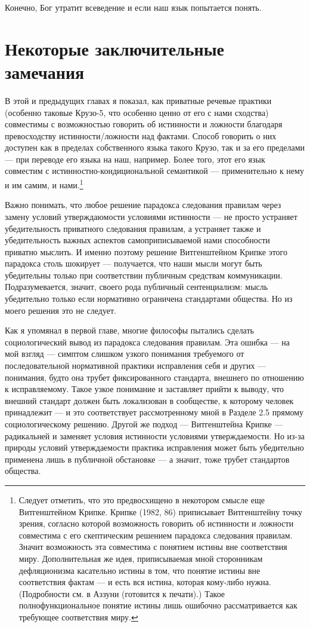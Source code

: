 \documentclass[11pt]{book}
\begin{document}
Конечно, Бог утратит всеведение и если наш язык попытается понять.

\section{Некоторые заключительные замечания}

В этой и предыдущих главах я показал, как приватные речевые практики (особенно таковые Крузо-5, что особенно ценно от его с нами сходства) совместимы с возможностью говорить об истинности и ложности благодаря превосходству истинности/ложности над фактами. Способ говорить о них доступен как в пределах собственного языка такого Крузо, так и за его пределами --- при переводе его языка на наш, например. Более того, этот его язык совместим с истинностно-кондициональной семантикой --- применительно к нему и им самим, и нами.\footnote{Следует отметить, что это предвосхищено в некотором смысле еще Витгенштейном Крипке. Крипке (1982, 86) приписывает Витгенштейну точку зрения, согласно которой возможность говорить об истинности и ложности совместима с его скептическим решением парадокса следования правилам. Значит возможность эта совместима с понятием истины вне соответствия миру. Дополнительная же идея, приписываемая мной сторонникам дефляционизма касательно истины в том, что понятие истины вне соответствия фактам --- и есть вся истина, которая кому-либо нужна. (Подробности см. в Аззуни (готовится к печати).) Такое полнофункциональное понятие истины лишь ошибочно рассматривается как требующее соответствия миру.}

Важно понимать, что любое решение парадокса следования правилам через замену условий утверждаюмости условиями истинности --- не просто устраняет убедительность приватного следования правилам, а устраняет также и убедительность важных аспектов самоприписываемой нами способности приватно мыслить. И именно поэтому решение Витгенштейном Крипке этого парадокса столь шокирует --- получается, что наши мысли могут быть убедительны только при соответствии публичным средствам коммуникации. Подразумевается, значит, своего рода публичный сентенциализм: мысль убедительно только если нормативно ограничена стандартами общества. Но из моего решения это не следует.

Как я упомянал в первой главе, многие философы пытались сделать социологический вывод из парадокса следования правилам. Эта ошибка --- на мой взгляд --- симптом слишком узкого понимания требуемого от последовательной нормативной практики исправления себя и других --- понимания, будто она трубет фиксированного стандарта, внешнего по отношению к исправляемому. Такое узкое понимание и заставляет прийти к выводу, что внешний стандарт должен быть локализован в сообществе, к которому человек принадлежит --- и это соответствует рассмотренному мной в Разделе 2.5 прямому социологическому решению. Другой же подход --- Витгенштейна Крипке --- радикальней и заменяет условия истинности условиями утверждаемости. Но из-за природы условий утверждаемости практика исправления может быть убедительно применена лишь в публичной обстановке --- а значит, тоже трубет стандартов общества.
\end{document}
